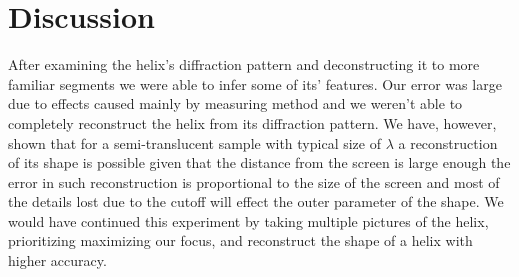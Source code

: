 \section{Discussion}
After examining the helix's diffraction pattern and deconstructing it to more familiar segments we were able to infer some of its' features.
Our error was large due to effects caused mainly by measuring method and we weren't able to completely reconstruct the helix from its diffraction pattern.
We have, however, shown that for a semi-translucent sample with typical size of $\lambda$ a reconstruction of its shape
is possible given that the distance from the screen is large enough the error in such reconstruction is proportional to the
size of the screen and most of the details lost due to the cutoff will effect the outer parameter of the shape.
We  would have continued this experiment by taking multiple pictures of the helix, prioritizing maximizing our focus,
and reconstruct the shape of a helix with higher accuracy.